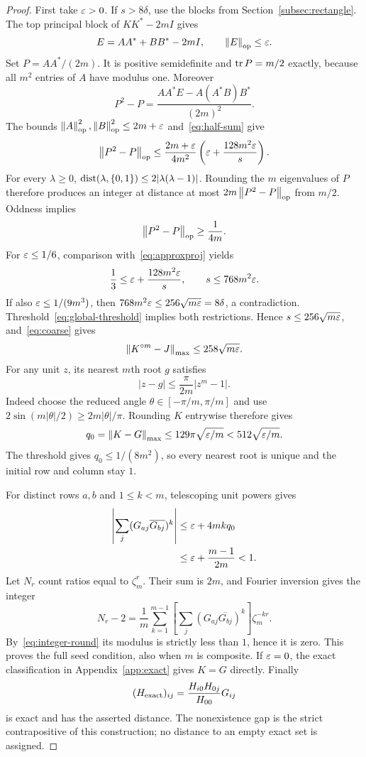 \begin{proof}
First take $\varepsilon>0$. If $s>8\delta$, use the blocks from Section~\ref{subsec:rectangle}. The top principal block of $KK^*-2mI$ gives
\[
 E=AA^*+BB^*-2mI,\qquad\left\lVert E\right\rVert_{\mathrm{op}}\le\varepsilon.
\]
Set $P=AA^*/(2m)$. It is positive semidefinite and $\operatorname{tr} P=m/2$ exactly, because all $m^2$ entries of $A$ have modulus one. Moreover
\[
 P^2-P=\frac{AA^*E-A(A^*B)B^*}{(2m)^2}.
\]
The bounds $\left\lVert A\right\rVert_{\mathrm{op}}^2,\left\lVert B\right\rVert_{\mathrm{op}}^2\le2m+\varepsilon$ and~\eqref{eq:half-sum} give
\begin{equation}\label{eq:approxproj}
 \left\lVert P^2-P\right\rVert_{\mathrm{op}}\le\frac{2m+\varepsilon}{4m^2}
       \left(\varepsilon+\frac{128m^2\varepsilon}{s}\right).
\end{equation}
For every $\lambda\ge0$, $\operatorname{dist}(\lambda,\{0,1\})\le2|\lambda(\lambda-1)|$. Rounding the $m$ eigenvalues of $P$ therefore produces an integer at distance at most $2m\left\lVert P^2-P\right\rVert_{\mathrm{op}}$ from $m/2$. Oddness implies
\[
 \left\lVert P^2-P\right\rVert_{\mathrm{op}}\ge\frac1{4m}.
\]
For $\varepsilon\le1/6$, comparison with~\eqref{eq:approxproj} yields
\[
 \frac13\le\varepsilon+\frac{128m^2\varepsilon}s,
 \qquad s\le768m^2\varepsilon.
\]
If also $\varepsilon\le1/(9m^3)$, then $768m^2\varepsilon\le256\sqrt{m\varepsilon}=8\delta$, a contradiction. Threshold~\eqref{eq:global-threshold} implies both restrictions. Hence $s\le256\sqrt{m\varepsilon}$, and~\eqref{eq:coarse} gives
\begin{equation}\label{eq:rootpower}
 \left\lVert K^{\circ m}-J\right\rVert_{\mathrm{max}}\le258\sqrt{m\varepsilon}.
\end{equation}
For any unit $z$, its nearest $m$th root $g$ satisfies
\begin{equation}\label{eq:angle-bound}
 |z-g|\le\frac\pi{2m}|z^m-1|.
\end{equation}
Indeed choose the reduced angle $\theta\in[-\pi/m,\pi/m]$ and use $2\sin(m|\theta|/2)\ge2m|\theta|/\pi$. Rounding $K$ entrywise therefore gives
\[
 q_0=\left\lVert K-G\right\rVert_{\mathrm{max}}\le129\pi\sqrt{\varepsilon/m}<512\sqrt{\varepsilon/m}.
\]
The threshold gives $q_0\le1/(8m^2)$, so every nearest root is unique and the initial row and column stay $1$.

For distinct rows $a,b$ and $1\le k<m$, telescoping unit powers gives
\begin{align}
 \left|\sum_j(G_{aj}\overline{G_{bj}})^k\right|
 &\le\varepsilon+4mkq_0\nonumber\\
 &\le\varepsilon+\frac{m-1}{2m}<1.\label{eq:integer-round}
\end{align}
Let $N_r$ count ratios equal to $\zeta_m^r$. Their sum is $2m$, and Fourier inversion gives the integer
\[
 N_r-2=\frac1m\sum_{k=1}^{m-1}
 \left[\sum_j(G_{aj}\overline{G_{bj}})^k\right]\zeta_m^{-kr}.
\]
By~\eqref{eq:integer-round} its modulus is strictly less than $1$, hence it is zero. This proves the full seed condition, also when $m$ is composite. If $\varepsilon=0$, the exact classification in Appendix~\ref{app:exact} gives $K=G$ directly. Finally
\[
 (H_{\rm exact})_{ij}=\frac{H_{i0}H_{0j}}{H_{00}}G_{ij}
\]
is exact and has the asserted distance. The nonexistence gap is the strict contrapositive of this construction; no distance to an empty exact set is assigned.
\end{proof}
